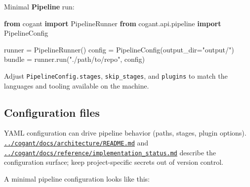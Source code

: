 \documentclass[
]{article}
\newenvironment{Shaded}{}{}
\newcommand{\ImportTok}[1]{\textcolor[rgb]{0.00,0.50,0.00}{\textbf{#1}}}
\newcommand{\NormalTok}[1]{#1}
\newcommand{\OperatorTok}[1]{\textcolor[rgb]{0.40,0.40,0.40}{#1}}
\newcommand{\StringTok}[1]{\textcolor[rgb]{0.25,0.44,0.63}{#1}}
\begin{document}
Minimal \textbf{Pipeline} run:

\begin{Shaded}
\begin{Highlighting}[]
\ImportTok{from}\NormalTok{ cogant }\ImportTok{import}\NormalTok{ PipelineRunner}
\ImportTok{from}\NormalTok{ cogant.api.pipeline }\ImportTok{import}\NormalTok{ PipelineConfig}

\NormalTok{runner }\OperatorTok{=}\NormalTok{ PipelineRunner()}
\NormalTok{config }\OperatorTok{=}\NormalTok{ PipelineConfig(output\_dir}\OperatorTok{=}\StringTok{"output/"}\NormalTok{)}
\NormalTok{bundle }\OperatorTok{=}\NormalTok{ runner.run(}\StringTok{"./path/to/repo"}\NormalTok{, config)}
\end{Highlighting}
\end{Shaded}

Adjust \texttt{PipelineConfig.stages}, \texttt{skip\_stages}, and
\texttt{plugins} to match the languages and tooling available on the
machine.

\subsection{Configuration files}\label{configuration-files}

YAML configuration can drive pipeline behavior (paths, stages, plugin
options).
\href{../cogant/docs/architecture/README.md}{\texttt{../cogant/docs/architecture/README.md}}
and
\href{../cogant/docs/reference/implementation_status.md}{\texttt{../cogant/docs/reference/implementation\_status.md}}
describe the configuration surface; keep project-specific secrets out of
version control.

A minimal pipeline configuration looks like this:
\end{document}
